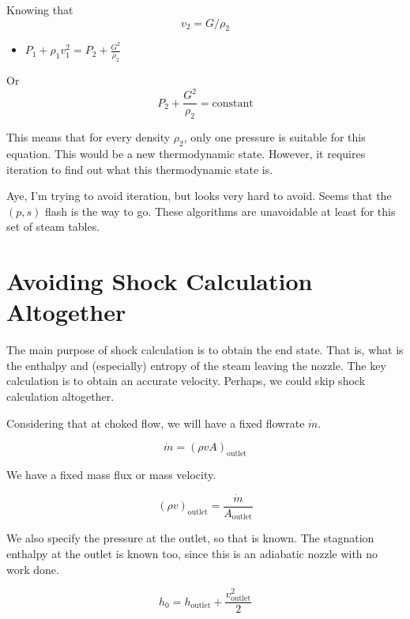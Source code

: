 \documentclass[masters]{ucbthesis}
\renewcommand{\_}{\kern-1.5pt\textunderscore\kern-1.5pt}
\begin{document}
Knowing that 
\begin{equation*}
	v_2 = G/\rho_2
\end{equation*}

\begin{itemize}
	\item $P_1 + \rho_1 v_1^2 = P_2 + \frac{G^2}{\rho_2}$
\end{itemize}

Or
\begin{equation*}
	 P_2 + \frac{G^2}{\rho_2} =\text{constant}
\end{equation*}

This means that for every density $\rho_2$, only one pressure is suitable 
for this equation. This would be a new thermodynamic state. However, it 
requires iteration to find out what this thermodynamic state is.

Aye, I'm trying to avoid iteration, but looks very hard to avoid. Seems 
that the $(p,s)$ flash is the way to go. These algorithms are unavoidable 
at least for this set of steam tables.

\section{Avoiding Shock Calculation Altogether}

The main purpose of shock calculation is to obtain the end state. That is,
what is the enthalpy and (especially) entropy of the steam leaving the nozzle.
The key calculation is to obtain an accurate velocity.
Perhaps, we could skip shock calculation altogether.

Considering that at choked flow, we will have a fixed flowrate $\dot{m}$.

\begin{equation*}
	\dot{m} = (\rho v A)_\text{outlet} 
\end{equation*}

We have a fixed mass flux or mass velocity. 

\begin{equation*}
	(\rho v)_\text{outlet} = \frac{\dot{m}}{A_\text{outlet}}
\end{equation*}

We also specify the pressure at the outlet, so that is known.
The stagnation enthalpy at the outlet is known too, since this is an 
adiabatic nozzle with no work done.

\begin{equation*}
	h_0 = h_\text{outlet} + \frac{v_\text{outlet}^2}{2}
\end{equation*}
\end{document}
